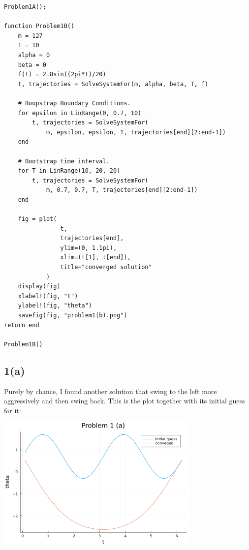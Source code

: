 \documentclass[]{article}
\begin{document}
\begin{lstlisting}
Problem1A();

function Problem1B()
    m = 127
    T = 10
    alpha = 0
    beta = 0
    f(t) = 2.8sin((2pi*t)/20)
    t, trajectories = SolveSystemFor(m, alpha, beta, T, f)

    # Boopstrap Boundary Conditions. 
    for epsilon in LinRange(0, 0.7, 10)
        t, trajectories = SolveSystemFor(
            m, epsilon, epsilon, T, trajectories[end][2:end-1])
    end
    
    # Bootstrap time interval.
    for T in LinRange(10, 20, 20)
        t, trajectories = SolveSystemFor(
            m, 0.7, 0.7, T, trajectories[end][2:end-1])
    end

    fig = plot(
                t, 
                trajectories[end], 
                ylim=(0, 1.1pi), 
                xlim=(t[1], t[end]), 
                title="converged solution"
            ) 
    display(fig)
    xlabel!(fig, "t")
    ylabel!(fig, "theta")
    savefig(fig, "problem1(b).png")
return end

Problem1B()        
        \end{lstlisting}
    \subsection*{1(a)}
        Purely by chance, I found another solution that swing to the left more aggressively and then swing back. This is the plot together with its initial guess for it: 
        \begin{center}
            \includegraphics[width=10cm]{problem1(a).png}    
        \end{center}
        
\end{document}
